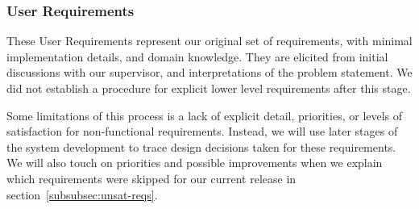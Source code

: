 \subsubsection{User Requirements}\label{subsubsec:user-reqs}

These User Requirements represent our original set of requirements, with minimal implementation details, and domain knowledge.
They are elicited from initial discussions with our supervisor,
and interpretations of the problem statement.
We did not establish a procedure for explicit lower level requirements after this stage.

Some limitations of this process is a lack of explicit detail, priorities, or levels of satisfaction for non-functional requirements.
Instead, we will use later stages of the system development to trace design decisions taken for these requirements.
We will also touch on priorities and possible improvements when we explain
which requirements were skipped for our current release in section~\ref{subsubsec:unsat-reqs}.

